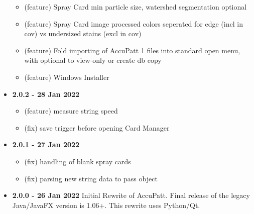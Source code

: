 \documentclass[10pt,letterpaper,titlepage]{article}
\begin{document}
\begin{itemize}
\begin{itemize}
            \item (feature) Spray Card min particle size, watershed segmentation optional
            \item (feature) Spray Card image processed colors seperated for edge (incl in cov) vs undersized stains (excl in cov)
            \item (feature) Fold importing of AccuPatt 1 files into standard open menu, with optional to view-only or create db copy
            \item (feature) Windows Installer
        \end{itemize}
        \item \textbf{2.0.2 - 28 Jan 2022}
        \begin{itemize}
            \item (feature) measure string speed
            \item (fix) save trigger before opening Card Manager
        \end{itemize}
        \item \textbf{2.0.1 - 27 Jan 2022}
        \begin{itemize}
            \item (fix) handling of blank spray cards
            \item (fix) parsing new string data to pass object
        \end{itemize}
        \item \textbf{2.0.0 - 26 Jan 2022} Initial Rewrite of AccuPatt. Final release of the legacy Java/JavaFX version is 1.06+. This rewrite uses Python/Qt.
    \end{itemize}
\end{document}

